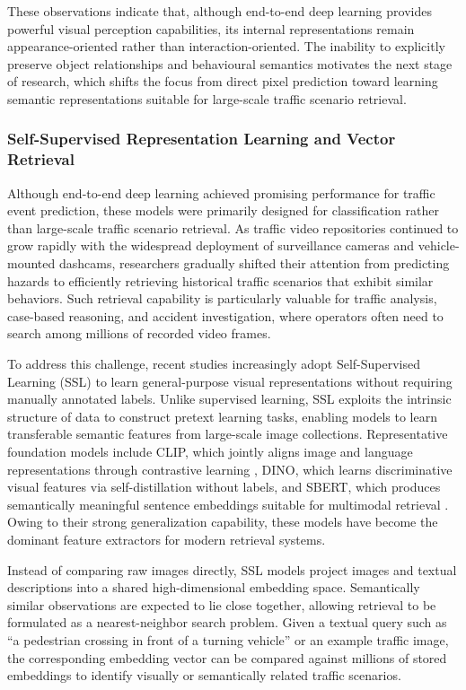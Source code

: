 \documentclass[a4paper, 11pt]{article} %
\begin{document}
These observations indicate that, although end-to-end deep learning provides powerful visual perception capabilities, its internal representations remain appearance-oriented rather than interaction-oriented. The inability to explicitly preserve object relationships and behavioural semantics motivates the next stage of research, which shifts the focus from direct pixel prediction toward learning semantic representations suitable for large-scale traffic scenario retrieval.
\subsubsection{Self-Supervised Representation Learning and Vector Retrieval}

Although end-to-end deep learning achieved promising performance for traffic event prediction, these models were primarily designed for classification rather than large-scale traffic scenario retrieval. As traffic video repositories continued to grow rapidly with the widespread deployment of surveillance cameras and vehicle-mounted dashcams, researchers gradually shifted their attention from predicting hazards to efficiently retrieving historical traffic scenarios that exhibit similar behaviors. Such retrieval capability is particularly valuable for traffic analysis, case-based reasoning, and accident investigation, where operators often need to search among millions of recorded video frames.

To address this challenge, recent studies increasingly adopt Self-Supervised Learning (SSL) to learn general-purpose visual representations without requiring manually annotated labels. Unlike supervised learning, SSL exploits the intrinsic structure of data to construct pretext learning tasks, enabling models to learn transferable semantic features from large-scale image collections. Representative foundation models include CLIP, which jointly aligns image and language representations through contrastive learning \cite{radford2021learning}, DINO, which learns discriminative visual features via self-distillation without labels, and SBERT, which produces semantically meaningful sentence embeddings suitable for multimodal retrieval \cite{reimers2019sentence}. Owing to their strong generalization capability, these models have become the dominant feature extractors for modern retrieval systems.

Instead of comparing raw images directly, SSL models project images and textual descriptions into a shared high-dimensional embedding space. Semantically similar observations are expected to lie close together, allowing retrieval to be formulated as a nearest-neighbor search problem. Given a textual query such as ``a pedestrian crossing in front of a turning vehicle'' or an example traffic image, the corresponding embedding vector can be compared against millions of stored embeddings to identify visually or semantically related traffic scenarios.
\end{document}
